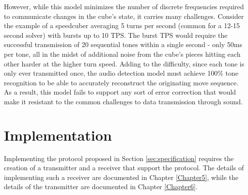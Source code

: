 However, while this model minimizes the number of discrete frequencies required to communicate changes in the cube's state, it carries many challenges.
Consider the example of a speedcuber averaging 5 turns per second (common for a 12-15 second solver) with bursts up to 10 TPS.
The burst TPS would require the successful transmission of 20 sequential tones within a single second - only 50ms per tone, all in the midst of additional noise from the cube's pieces hitting each other harder at the higher turn speed.
Adding to the difficulty, since each tone is only ever transmitted once, the audio detection model must achieve 100\% tone recognition to be able to accurately reconstruct the originating move sequence.
As a result, this model fails to support any sort of error correction that would make it resistant to the common challenges to data transmission through sound.


\section{Implementation}
\label{sec:implementation}
Implementing the protocol proposed in Section \ref{sec:specification} requires the creation of a transmitter and a receiver that support the protocol. The details of implementing such a receiver are documented in Chapter \ref{Chapter5}, while the details of the transmitter are documented in Chapter \ref{Chapter6}.